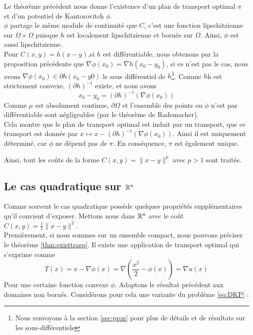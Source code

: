 \documentclass[a4paper,12pt]{article}
\begin{document}
\begin{preuve}
Le théorème précédent nous donne l'existence d'un plan de transport optimal $\pi$ et d'un potentiel de Kantorovitch $\phi$.\\

$\phi$ partage le même module de continuité que $C$, c'est une fonction lipschitzienne sur $\Omega\times\Omega$ puisque $h$ est localement lipschitzienne et bornée sur $\Omega$. Ainsi, $\phi$ est aussi lipschitzienne.\\

Pour $C(x,y) = h(x-y)$,si $h$ est différentiable, nous obtenons par la proposition précédente que $\nabla\phi (x_0)=\nabla h(x_0-y_0)$, si ce n'est pas le cas, nous avons $\nabla\phi(x_0)\in\partial h(x_0-y0)$ le sous différentiel de $h$\footnote{Nous renvoyons à la section \ref{sec:prox} pour plus de détails et de résultats sur les sous-différentiels}. Comme $h$h est strictement convexe, $(\partial h)^{-1}$ existe, et nous avons 
$$
x_0-y_0=(\partial h)^{-1}(\nabla\phi(x_0))
$$
Comme $\mu$ est absolument continue, $\partial\Omega$ et l'ensemble des points ou $\phi$ n'est pas différentiable sont négligeables (par le théorème de Rademacher). \\

Cela montre que le plan de transport optimal est induit par un transport, que ce transport est donnée par $x\mapsto x -(\partial h)^{-1}(\nabla\phi(x_0))$. Ainsi il est uniquement déterminé, car $\phi$ ne dépend pas de $\pi$. En conséquence, $\pi$ est également unique. 
\end{preuve}
Ainsi, tout les coûts de la forme $C(x,y) =\|x-y\|^p$ avec $p>1$ sont traités. 


\subsection{Le cas quadratique sur $\mathbb{R}^n$}
Comme souvent le cas quadratique possède quelques propriétés supplémentaires qu'il convient d'exposer. Mettons nous dans $\mathbb{R}^n $ avec le coût $C(x,y)=\frac{1}{1}\|x-y\|^2$.\\
Premièrement, si nous sommes sur un ensemble compact, nous pouvons préciser le théorème \eqref{thm:existtrasp}. Il existe une application de transport optimal qui s'exprime comme 
$$
T(x) = x -\nabla\phi(x) = \nabla\left(\frac{x^2}{2}-\phi(x)\right) = \nabla u(x)
$$
Pour une certaine fonction convexe $\phi$. Adaptons le résultat précédent aux domaines non bornés. Considérons pour cela une variante du problème \eqref{eq:DKP} : \\
\end{document}
